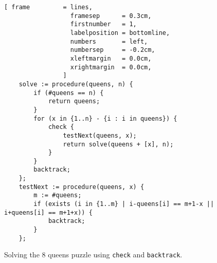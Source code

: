 \begin{figure}[!ht]
\centering
\begin{Verbatim}[ frame         = lines, 
                  framesep      = 0.3cm, 
                  firstnumber   = 1,
                  labelposition = bottomline,
                  numbers       = left,
                  numbersep     = -0.2cm,
                  xleftmargin   = 0.0cm,
                  xrightmargin  = 0.0cm,
                ]
    solve := procedure(queens, n) { 
        if (#queens == n) {
            return queens;
        }
        for (x in {1..n} - {i : i in queens}) {
            check {
                testNext(queens, x);
                return solve(queens + [x], n);
            } 
        }
        backtrack;
    };
    testNext := procedure(queens, x) {
        m := #queens;
        if (exists (i in {1..m} | i-queens[i] == m+1-x || i+queens[i] == m+1+x)) {
            backtrack;
        }
    };
\end{Verbatim}
\vspace*{-0.3cm}
\caption{Solving the 8 queens puzzle using \texttt{check} and \texttt{backtrack}.}
\label{fig:queens-nice.stlx}
\end{figure}
